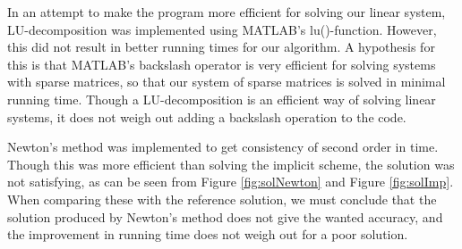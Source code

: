 In an attempt to make the program more efficient for solving our linear system, LU-decomposition was implemented using MATLAB's lu()-function. However, this did not result in better running times for our algorithm. A hypothesis for this is that MATLAB's backslash operator is very efficient for solving systems with sparse matrices, so that our system of sparse matrices is solved in minimal running time. Though a LU-decomposition is an efficient way of solving linear systems, it does not weigh out adding a backslash operation to the code.

Newton's method was implemented to get consistency of second order in time. Though this was more efficient than solving the implicit scheme, the solution was not satisfying, as can be seen from Figure \ref{fig:solNewton} and Figure \ref{fig:solImp}. When comparing these with the reference solution, we must conclude that the solution produced by Newton's method does not give the wanted accuracy, and the improvement in running time does not weigh out for a poor solution.

